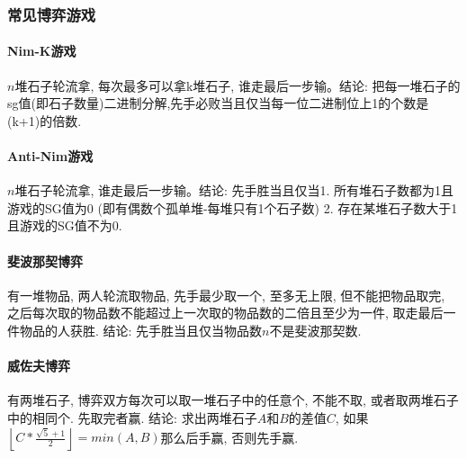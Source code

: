 \begin{small}
\subsubsection{常见博弈游戏}
\begin{multicols}{2}
\paragraph{Nim-K游戏}$n$堆石子轮流拿, 每次最多可以拿k堆石子, 谁走最后一步输。结论: 把每一堆石子的sg值(即石子数量)二进制分解,先手必败当且仅当每一位二进制位上1的个数是(k+1)的倍数. 
\paragraph{Anti-Nim游戏}$n$堆石子轮流拿, 谁走最后一步输。结论: 先手胜当且仅当1. 所有堆石子数都为1且游戏的SG值为0 (即有偶数个孤单堆-每堆只有1个石子数) 2. 存在某堆石子数大于1且游戏的SG值不为0.
\paragraph{斐波那契博弈}有一堆物品, 两人轮流取物品, 先手最少取一个, 至多无上限, 但不能把物品取完, 之后每次取的物品数不能超过上一次取的物品数的二倍且至少为一件, 取走最后一件物品的人获胜. 结论: 先手胜当且仅当物品数$n$不是斐波那契数. 
\paragraph{威佐夫博弈}有两堆石子, 博弈双方每次可以取一堆石子中的任意个, 不能不取, 或者取两堆石子中的相同个. 先取完者赢. 结论: 求出两堆石子$A$和$B$的差值$C$, 如果$\left\lfloor C*\frac{\sqrt{5}+1}{2}\right\rfloor=min(A,B)$那么后手赢, 否则先手赢. 

\end{multicols}
\end{small}
